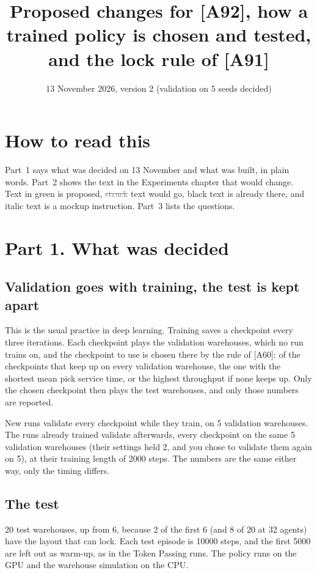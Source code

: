 \documentclass[11pt,a4paper]{article}
\title{Proposed changes for [A92], how a trained policy is chosen and tested, and the lock rule of [A91]}
\date{13 November 2026, version 2 (validation on 5 seeds decided)}
\newcommand{\new}[1]{\textcolor{newc}{#1}}
\newcommand{\old}[1]{\textcolor{gray}{\st{#1}}}
\begin{document}
\maketitle

\section*{How to read this}
Part~1 says what was decided on 13 November and what was built, in plain words.
Part~2 shows the text in the Experiments chapter that would change. Text in
\new{green} is proposed, \old{struck} text would go, black text is already
there, and italic text is a mockup instruction. Part~3 lists the questions.

\section*{Part 1. What was decided}

\subsection*{Validation goes with training, the test is kept apart}
This is the usual practice in deep learning. Training saves a checkpoint every
three iterations. Each checkpoint plays the validation warehouses, which no run
trains on, and the checkpoint to use is chosen there by the rule of [A60]: of the
checkpoints that keep up on every validation warehouse, the one with the shortest
mean pick service time, or the highest throughput if none keeps up. Only the
chosen checkpoint then plays the test warehouses, and only those numbers are
reported.

New runs validate every checkpoint while they train, on 5 validation warehouses.
The runs already trained validate afterwards, every checkpoint on the same 5
validation warehouses (their settings held 2, and you chose to validate them
again on 5), at their training length of 2000 steps. The numbers are the same
either way, only the timing differs.

\subsection*{The test}
20 test warehouses, up from 6, because 2 of the first 6 (and 8 of 20 at 32
agents) have the layout that can lock. Each test episode is 10000 steps, and the
first 5000 are left out as warm-up, as in the Token Passing runs. The policy runs
on the GPU and the warehouse simulation on the CPU.
\end{document}
